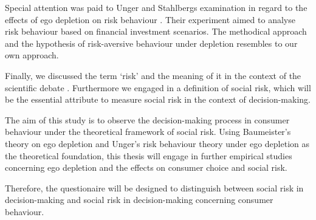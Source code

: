 Special attention was paid to Unger and Stahlbergs examination in regard to the effects of ego depletion on risk behaviour \citep{unger2011ego}. Their experiment aimed to analyse risk behaviour based on financial investment scenarios. The methodical approach and the hypothesis of risk-aversive behaviour under depletion resembles to our own approach.\par
Finally, we discussed the term ‘risk’ and the meaning of it in the context of the scientific debate \citep{ross1975perceived,dowling1994model}. Furthermore we engaged in a definition of social risk, which will be the essential attribute to measure social risk in the context of decision-making.\par
The aim of this study is to observe the decision-making process in consumer behaviour under the theoretical framework of social risk. Using Baumeister’s  theory on ego depletion and Unger’s risk behaviour theory under ego depletion as the theoretical foundation, this thesis will engage in further empirical studies concerning ego depletion and the effects on consumer choice and social risk.\par
Therefore, the questionaire will be designed to distinguish between social risk in decision-making and social risk in decision-making concerning consumer behaviour.

